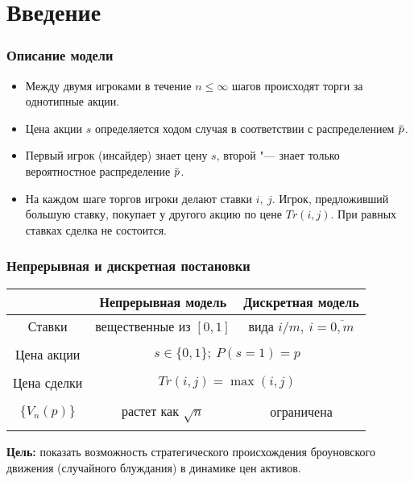 \documentclass[12pt]{beamer}
\title{\small{\thesisTitle}}
\author{\small{%
\emph{Выступающий:}~\thesisAuthorShort\\%
\emph{Руководитель:}~\supervisorRegaliaShort~\supervisorFioShort}\\%
\vspace{30pt}%
\thesisOrganization%
\vspace{20pt}%
}
\date{\small{\thesisCity, \thesisYear}}
\newcommand{\overbar}[1]{\mkern 1.5mu\overline{\mkern-1.3mu#1\mkern-1.3mu}\mkern 1.3mu}
\newcommand{\p}{\overbar{p}}
\begin{document}
\maketitle

\section{Введение}

\begin{frame}
  \frametitle{Описание модели}
  \begin{itemize}
  \item
    Между двумя игроками в течение $n \leqslant \infty$ шагов происходят
    торги за однотипные акции.
  \item
    Цена акции $s$ определяется ходом случая в соответствии с распределением $\p$.
  \item
    Первый игрок (инсайдер) знает цену $s$, второй "--- знает только вероятностное распределение $\p$.
  \item
    На каждом шаге торгов игроки делают ставки $i,\ j$.
    Игрок, предложивший большую ставку, покупает у другого акцию по цене $Tr(i, j)$.
    При равных ставках сделка не состоится.
  \end{itemize}
\end{frame}

\begin{frame}
  \frametitle{Непрерывная и дискретная постановки}
  
  \begin{tabular}{c|c|c}
    & Непрерывная модель & Дискретная модель \\
    \midrule
    Ставки & вещественные из $[0, 1]$ & вида $i/m,\ i = \overline{0, m}$ \\
    \hline \\
    Цена акции& \multicolumn{2}{c}{$s \in \{0, 1\};\ P(s = 1) = p$} \\
    \hline \\
    Цена сделки& \multicolumn{2}{c}{$Tr(i, j) = \max(i, j)$} \\
    \hline \\
    $\{V_n(p)\}$ & растет как $\sqrt{n}$ & ограничена \\
    \bottomrule \\
  \end{tabular}

  \textbf{Цель:} показать возможность стратегического происхождения броуновского движения (случайного блуждания) в динамике цен активов.
\end{frame}
\end{document}
